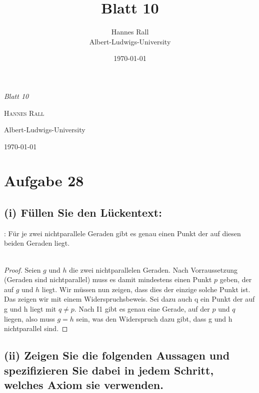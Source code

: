 \documentclass[12pt,a4paper]{article}
\title{Blatt 10}
\author{Hannes Rall \\ Albert-Ludwigs-University}
\date{\today}
\newcommand{\zz}{\stackinset{c}{2.5pt}{c}{-2.5pt}{\textsf{Z}}{\textsf{Z}}}
\begin{document}
\begin{titlepage}
    \centering
    \vspace*{2cm}
    {\Huge\itshape Blatt 10\par}
    \vspace{2cm}
    {\Large\textsc{Hannes Rall}\par}
    \vfill
    {\large Albert-Ludwigs-University\\}
    \vspace{1cm}
    {\large\today\par}
\end{titlepage}

\newpage
\section*{Aufgabe 28}
\subsection*{(i) Füllen Sie den Lückentext:}
\zz : Für je zwei nichtparallele Geraden gibt es genau einen Punkt der auf diesen beiden Geraden liegt.\\
\
\begin{proof}
Seien $g$ und $h$ die zwei nichtparallelen Geraden. Nach Vorraussetzung (Geraden sind nichtparallel) muss es damit mindestens einen Punkt $p$ geben, der auf $g$ und $h$ liegt. Wir müssen nun zeigen, dass dies der einzige solche Punkt ist. Das zeigen wir mit einem Widerspruchsbeweis. Sei dazu auch q ein Punkt der auf g und h liegt mit $q \neq p$. Nach I1 gibt es genau eine Gerade, auf der $p$ und $q$ liegen, also muss $g=h$ sein, was den Widerspruch dazu gibt, dass g und h nichtparallel sind.
\end{proof}

\subsection*{(ii) Zeigen Sie die folgenden Aussagen und spezifizieren Sie dabei in jedem Schritt, welches Axiom sie
verwenden.}
\end{document}
